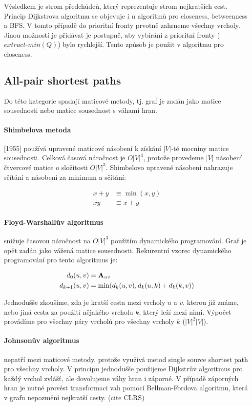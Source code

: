 \documentclass[12pt,titlepage]{report}
\begin{document}
Výsledkem je strom předchůdců, který reprezentuje strom nejkratších cest.
Princip Dijkstrova algoritmu se objevuje i u algoritmů pro closeness,
betweenness a BFS. V tomto případě do prioritní fronty prvotně zahrneme všechny
vrcholy. Jinou možností je přidávat je postupně, aby vybírání z prioritní
fronty ($extract\mbox{-}min(Q)$) bylo rychlejší. Tento způsob je použit v
algoritmu pro closeness.


\subsection{All-pair shortest paths}
Do této kategorie spadají maticové metody, tj. graf je zadán jako matice
sousednosti nebo matice sousednost s váhami hran.


\paragraph{Shimbelova metoda}
[1955] používá upravené maticové násobení k získání $|V|$-té mocniny matice
sousednosti. Celková časová náročnost je $O|V|^4$, protože provedeme $|V|$
násobení čtvercové matice o složitosti $O|V|^3$. Shimbelovo upravené násobení
nahrazuje sčítání a násobení za minimum a sčítání:

\begin{align*}
x + y &\equiv \min(x, y) \\
xy &\equiv x + y
\end{align*}

\paragraph{Floyd-Warshallův algoritmus} snižuje časovou náročnost na $O|V|^3$
použitím dynamického programování. Graf je opět zadán jako vážená matice
sousednosti. Rekurentní vzorec dynamického programování pro tento algoritmus je:

\begin{align*}
d_0(u, v) &= {\bf A}_{uv} \\
d_{k + 1}(u, v) &= \min(d_k(u, v), d_k(u, k) + d_k(k, v)) \\
\end{align*}

Jednodušše zkoušíme, zda je kratší cesta mezi vrcholy $u$ a $v$, kterou již
známe, nebo jiná cesta za použití nějakého vrcholu $k$, který leží mezi nimi.
Výpočet provádíme pro všechny páry vrcholů pro všechny vrcholy $k$ ($|V|^2
|V|$).

\paragraph{Johnsonův algoritmus} nepatří mezi maticové metody, protože využívá
metod single source shortest path pro všechny vrcholy. V principu jednodušše
použijeme Dijkstrův algoritmus pro každý vrchol zvlášť, ale dovolujeme váhy
hran i záporné. V případě záporných hran je nutné provést transformaci vah
pomocí Bellman-Fordova algoritmu, která v grafu nepozmění nejkratší cesty. 
(cite CLRS)
\end{document}
